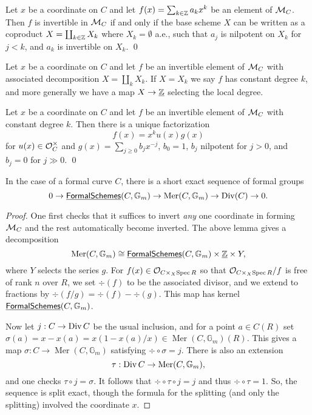 \begin{lemma}
Let $x$ be a coordinate on $C$ and let $f(x) = \sum_{k \in \mathbb Z} a_k x^k$ be an element of $\mathcal{M}_C$.  Then $f$ is invertible in $\mathcal{M}_C$ if and only if the base scheme $X$ can be written as a coproduct $X = \coprod_{k \in \mathbb Z} X_k$ where $X_k = \emptyset$ a.e., such that $a_j$ is nilpotent on $X_k$ for $j < k$, and $a_k$ is invertible on $X_k$. \qed
\end{lemma}

\begin{definition}
Let $x$ be a coordinate on $C$ and let $f$ be an invertible element of $\mathcal{M}_C$ with associated decomposition $X = \coprod_k X_k$.  If $X = X_k$ we say $f$ has constant degree $k$, and more generally we have a map $X \to \underline{\mathbb Z}$ selecting the local degree.
\end{definition}

\begin{lemma}
Let $x$ be a coordinate on $C$ and let $f$ be an invertible element of $\mathcal{M}_C$ with constant degree $k$.  Then there is a unique factorization \[f(x) = x^k u(x) g(x)\] for $u(x) \in \mathcal{O}_C^\times$ and $g(x) = \sum_{j \ge 0} b_j x^{-j}$, $b_0 = 1$, $b_j$ nilpotent for $j > 0$, and $b_j = 0$ for $j \gg 0$. \qed
\end{lemma}

\begin{lemma}
In the case of a formal curve $C$, there is a short exact sequence of formal groups \[0 \to \underline{\mathsf{FormalSchemes}}(C, \mathbb G_m) \to \operatorname{Mer}(C, \mathbb G_m) \to \operatorname{Div}(C) \to 0.\]
\end{lemma}
\begin{proof}
One first checks that it suffices to invert \emph{any} one coordinate in forming $\mathcal{M}_C$ and the rest automatically become inverted.  The above lemma gives a decomposition \[\operatorname{Mer}(C, \mathbb G_m) \cong \underline{\mathsf{FormalSchemes}}(C, \mathbb G_m) \times \underline{\mathbb Z} \times Y,\] where $Y$ selects the series $g$.  For $f(x) \in \mathcal{O}_{C \times_X \operatorname{Spec} R}$ so that $\mathcal{O}_{C \times_X \operatorname{Spec} R} / f$ is free of rank $n$ over $R$, we set $\div(f)$ to be the associated divisor, and we extend to fractions by $\div(f/g) = \div(f) - \div(g)$.  This map has kernel $\underline{\mathsf{FormalSchemes}}(C, \mathbb G_m)$.

Now let $j: C \to \operatorname{Div} C$ be the usual inclusion, and for a point $a \in C(R)$ set $\sigma(a) = x - x(a) = x(1 - x(a)/x) \in \operatorname{Mer}(C, \mathbb G_m)(R)$.  This gives a map $\sigma: C \to \operatorname{Mer}(C, \mathbb G_m)$ satisfying $\div \circ \sigma = j$.  There is also an extension \[ \tau: \operatorname{Div} C \to \operatorname{Mer}(C, \mathbb G_m),\] and one checks $\tau \circ j = \sigma$.  It follows that $\div \circ \tau \circ j = j$ and thus $\div \circ \tau = 1$.  So, the sequence is split exact, though the formula for the splitting (and only the splitting) involved the coordinate $x$.
\end{proof}


